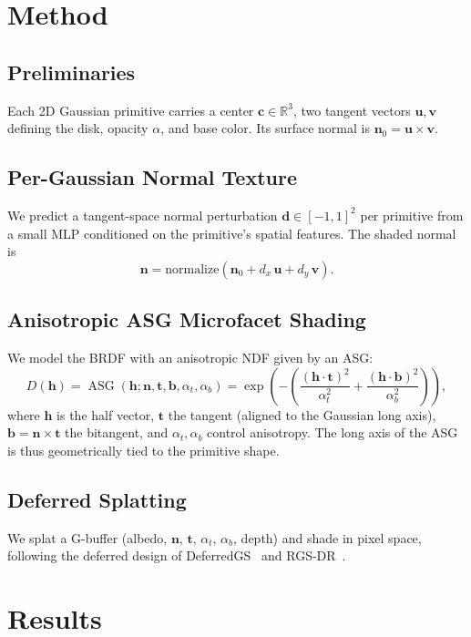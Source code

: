 \documentclass[acmtog, review=true, authorversion=false]{acmart}
\newcommand{\vect}[1]{\mathbf{#1}}
\DeclareMathOperator{\ASG}{ASG}
\begin{document}
\section{Method}\label{sec:method}

\subsection{Preliminaries}
Each 2D Gaussian primitive carries a center $\vect{c}\in\mathbb{R}^3$,
two tangent vectors $\vect{u},\vect{v}$ defining the disk, opacity
$\alpha$, and base color. Its surface normal is
$\vect{n}_0 = \vect{u}\times\vect{v}$.

\subsection{Per-Gaussian Normal Texture}
We predict a tangent-space normal perturbation
$\vect{d}\in[-1,1]^2$ per primitive from a small MLP conditioned on
the primitive's spatial features. The shaded normal is
\[
  \vect{n} = \mathrm{normalize}\!\left(
    \vect{n}_0 + d_x\,\vect{u} + d_y\,\vect{v}
  \right).
\]

\subsection{Anisotropic ASG Microfacet Shading}
We model the BRDF with an anisotropic NDF given by an ASG:
\[
  D(\vect{h}) = \ASG(\vect{h};\vect{n},\vect{t},\vect{b},\alpha_t,\alpha_b)
  = \exp\!\left(
      -\left(\frac{(\vect{h}\cdot\vect{t})^2}{\alpha_t^2}
            +\frac{(\vect{h}\cdot\vect{b})^2}{\alpha_b^2}\right)
    \right),
\]
where $\vect{h}$ is the half vector, $\vect{t}$ the tangent (aligned to
the Gaussian long axis), $\vect{b}=\vect{n}\times\vect{t}$ the bitangent,
and $\alpha_t,\alpha_b$ control anisotropy. The long axis of the ASG
is thus geometrically tied to the primitive shape.

\subsection{Deferred Splatting}
We splat a G-buffer (albedo, $\vect{n}$, $\vect{t}$, $\alpha_t$,
$\alpha_b$, depth) and shade in pixel space, following the deferred
design of DeferredGS~\cite{deferredgs} and
RGS-DR~\cite{rgsdr}.

\section{Results}\label{sec:results}
\end{document}
